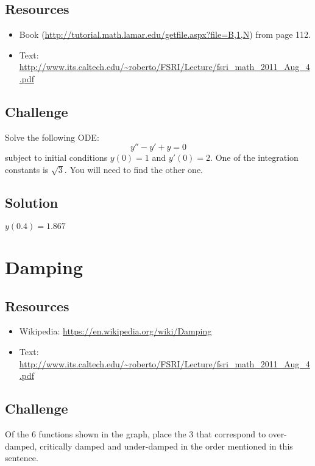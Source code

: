 \subsection*{Resources}
\begin{itemize}
    \item Book (\url{http://tutorial.math.lamar.edu/getfile.aspx?file=B,1,N}) from page 112.
    \item Text: \url{http://www.its.caltech.edu/~roberto/FSRI/Lecture/fsri_math_2011_Aug_4.pdf}
\end{itemize}

\subsection*{Challenge}
Solve the following ODE:
\begin{equation}
    y'' - y' + y = 0
\end{equation}
subject to initial conditions $y(0)=1$ and $y'(0)=2$. One of the integration constants is $\sqrt{3}$. You will need to find the other one.

\subsection*{Solution}
$y(0.4)=1.867$




\newpage
\section{Damping}
\label{sec:damping}

\subsection*{Resources}
\begin{itemize}
    \item Wikipedia: \url{https://en.wikipedia.org/wiki/Damping}
    \item Text: \url{http://www.its.caltech.edu/~roberto/FSRI/Lecture/fsri_math_2011_Aug_4.pdf}
\end{itemize}

\subsection*{Challenge}
Of the 6 functions shown in the graph, place the 3 that correspond to over-damped, critically damped and under-damped in the order mentioned in this sentence.


